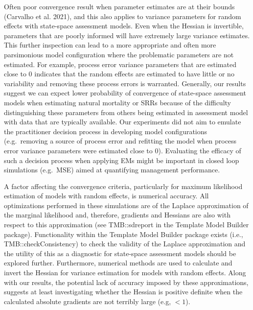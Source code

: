\documentclass[
  12pt,
]{article}
\providecommand{\DIFadd}[1]{{\protect\color{blue}\uwave{#1}}} %
\providecommand{\DIFaddbegin}{} %
\providecommand{\DIFaddend}{} %
\providecommand{\DIFdelbegin}{} %
\providecommand{\DIFdelend}{} %
\newcommand{\DIFscaledelfig}{0.5}
\newlength{\DIFdelgraphicswidth} %
\newlength{\DIFdelgraphicsheight} %
\newcommand{\DIFaddincludegraphics}[2][]{{\color{blue}\fbox{\DIFOincludegraphics[#1]{#2}}}} %
\newcommand{\DIFdelincludegraphics}[2][]{%
\sbox{\DIFdelgraphicsbox}{\DIFOincludegraphics[#1]{#2}}%
\settoboxwidth{\DIFdelgraphicswidth}{\DIFdelgraphicsbox} %
\settoboxtotalheight{\DIFdelgraphicsheight}{\DIFdelgraphicsbox} %
\scalebox{\DIFscaledelfig}{%
\parbox[b]{\DIFdelgraphicswidth}{\usebox{\DIFdelgraphicsbox}\\[-\baselineskip] \rule{\DIFdelgraphicswidth}{0em}}\llap{\resizebox{\DIFdelgraphicswidth}{\DIFdelgraphicsheight}{%
\setlength{\unitlength}{\DIFdelgraphicswidth}%
\begin{picture}(1,1)%
\thicklines\linethickness{2pt} %
{\color[rgb]{1,0,0}\put(0,0){\framebox(1,1){}}}%
{\color[rgb]{1,0,0}\put(0,0){\line( 1,1){1}}}%
{\color[rgb]{1,0,0}\put(0,1){\line(1,-1){1}}}%
\end{picture}%
}\hspace*{3pt}}} %
} %
\DeclareRobustCommand{\DIFaddbegin}{\DIFOaddbegin \let\includegraphics\DIFaddincludegraphics} %
\DeclareRobustCommand{\DIFaddend}{\DIFOaddend \let\includegraphics\DIFOincludegraphics} %
\DeclareRobustCommand{\DIFdelbegin}{\DIFOdelbegin \let\includegraphics\DIFdelincludegraphics} %
\DeclareRobustCommand{\DIFdelend}{\DIFOaddend \let\includegraphics\DIFOincludegraphics} %
\begin{document}
Often poor convergence result when parameter estimates are at their
bounds (Carvalho et al. 2021), and this also applies to variance
parameters for random effects with state-space assessment models. Even
when the Hessian is invertible, parameters that are poorly informed will
have extremely large variance estimates. This further inspection can
lead to a more appropriate and often more parsimonious model
configuration where the problematic parameters are not estimated. For
example, process error variance parameters that are estimated close to 0
indicates that the random effects are estimated to have little or no
variability and removing these process errors is warranted. Generally,
our results suggest we can expect lower probability of convergence of
state-space assessment models when estimating natural mortality or SRRs
because of the difficulty distinguishing these parameters from others
being estimated in assessment model with data that are typically
available. Our experiments did not aim to emulate the practitioner
decision process in developing model configurations (e.g.~removing a
source of process error and refitting the model when process error
variance parameters were estimated close to 0). Evaluating the efficacy
of such a decision process when applying EMs might be important in
closed loop simulations (e.g.~MSE) aimed at quantifying management
performance.

A factor affecting the convergence criteria, particularly for maximum
likelihood estimation of models with random effects, is numerical
accuracy. All optimizations performed in these simulations are of the
Laplace approximation of the marginal likelihood and, therefore,
gradients and Hessians are also with respect to this approximation (see
TMB::sdreport in the Template Model Builder package). Functionality
within the Template Model Builder package exists (i.e.,
TMB::checkConsistency) to check the validity of the Laplace
approximation and the utility of this as a diagnostic for state-space
assessment models should be explored further. Furthermore, numerical
methods are used to calculate and invert the Hessian for variance
estimation for models with random effects. Along with our results, the
potential lack of accuracy imposed by these approximations, suggests at
least investigating whether the Hessian is positive definite when the
calculated absolute gradients are not terribly large (e.g, \(< 1\)).

\DIFdelbegin %
\DIFdelend \DIFaddbegin \subsection*{\DIFadd{AIC}}\label{aic}
\DIFaddend {}
\end{document}
